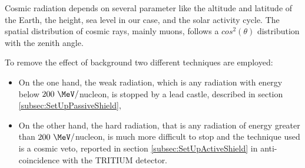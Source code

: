Cosmic radiation depends on several parameter like the altitude and latitude of the Earth, the height, sea level in our case, and the solar activity cycle. The spatial distribution of cosmic rays, mainly muons, follows a $cos^2(\theta)$ distribution with the zenith angle. 

To remove the effect of background two different techniques are employed:

\begin{itemize}

\item{}  On the one hand, the weak radiation, which is any radiation with energy below $200~\MeV/$nucleon, is stopped by a lead castle, described in section \ref{subsec:SetUpPassiveShield},

\item{} On the other hand, the hard radiation, that is any radiation of energy greater than $200~\MeV/$nucleon, is much more difficult to stop and the technique used is a cosmic veto, reported in section \ref{subsec:SetUpActiveShield} in anti-coincidence with the TRITIUM detector. %

\end{itemize}